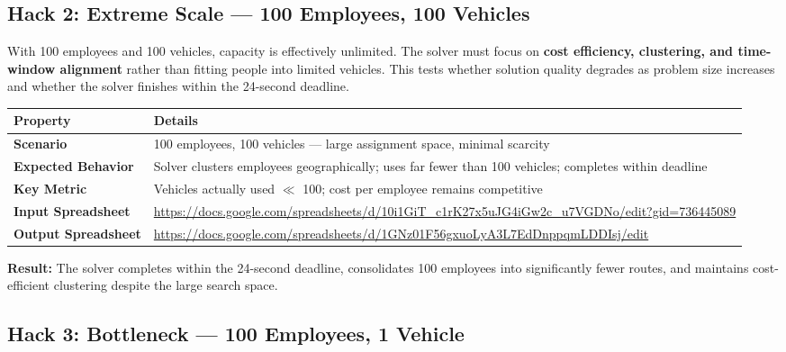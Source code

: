 \documentclass[11pt,a4paper]{article}
\begin{document}
\subsection{Hack 2: Extreme Scale --- 100 Employees, 100 Vehicles}

\begin{hackbox}
With 100 employees and 100 vehicles, capacity is effectively unlimited. The solver must focus on \textbf{cost efficiency, clustering, and time-window alignment} rather than fitting people into limited vehicles. This tests whether solution quality degrades as problem size increases and whether the solver finishes within the 24-second deadline.
\end{hackbox}

\begin{table}[H]
\centering
\begin{tabular}{p{3.5cm}p{10cm}}
\toprule
\textbf{Property} & \textbf{Details} \\
\midrule
\rowcolor{rowalt}
\textbf{Scenario} & 100 employees, 100 vehicles --- large assignment space, minimal scarcity \\
\textbf{Expected Behavior} & Solver clusters employees geographically; uses far fewer than 100 vehicles; completes within deadline \\
\rowcolor{rowalt}
\textbf{Key Metric} & Vehicles actually used $\ll$ 100; cost per employee remains competitive \\
\textbf{Input Spreadsheet} & \scriptsize\url{https://docs.google.com/spreadsheets/d/10i1GiT_c1rK27x5uJG4iGw2c_u7VGDNo/edit?gid=736445089} \\
\rowcolor{rowalt}
\textbf{Output Spreadsheet} & \scriptsize\url{https://docs.google.com/spreadsheets/d/1GNz01F56gxuoLyA3L7EdDnppqmLDDIsj/edit} \\
\bottomrule
\end{tabular}
\end{table}

\begin{resultbox}
\textbf{Result:} The solver completes within the 24-second deadline, consolidates 100 employees into significantly fewer routes, and maintains cost-efficient clustering despite the large search space.
\end{resultbox}


\subsection{Hack 3: Bottleneck --- 100 Employees, 1 Vehicle}
\end{document}

